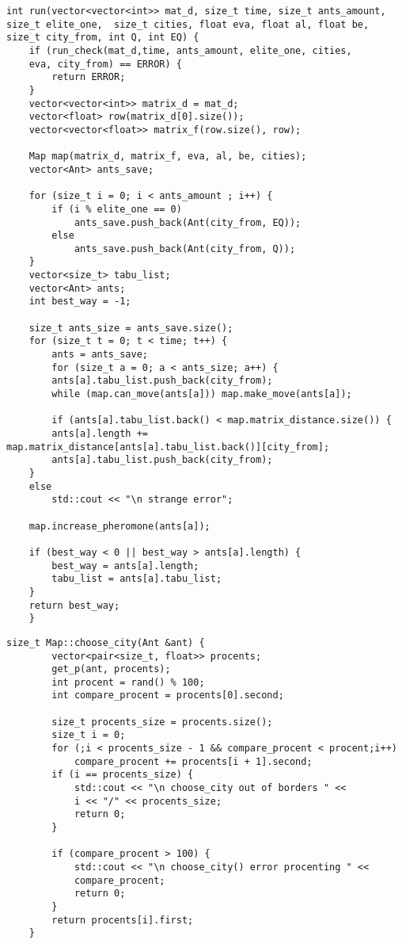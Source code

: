 \documentclass[12pt, a4paper]{report}
\begin{document}
    \begin{lstlisting}[label=code:run,caption=Функция run - получить кратчайший путь]
    int run(vector<vector<int>> mat_d, size_t time, size_t ants_amount, size_t elite_one,  size_t cities, float eva, float al, float be,  size_t city_from, int Q, int EQ) {
    if (run_check(mat_d,time, ants_amount, elite_one, cities,
    eva, city_from) == ERROR) {
    	return ERROR;
    }
    vector<vector<int>> matrix_d = mat_d;
    vector<float> row(matrix_d[0].size());
    vector<vector<float>> matrix_f(row.size(), row);
    
    Map map(matrix_d, matrix_f, eva, al, be, cities);
    vector<Ant> ants_save;
    
    for (size_t i = 0; i < ants_amount ; i++) {
	    if (i % elite_one == 0)
	    	ants_save.push_back(Ant(city_from, EQ));
	    else
	    	ants_save.push_back(Ant(city_from, Q));
    }
    vector<size_t> tabu_list;
    vector<Ant> ants;
    int best_way = -1;
    
    size_t ants_size = ants_save.size();
    for (size_t t = 0; t < time; t++) {
	    ants = ants_save;
	    for (size_t a = 0; a < ants_size; a++) {
	    ants[a].tabu_list.push_back(city_from);
	    while (map.can_move(ants[a])) map.make_move(ants[a]);
	    
	    if (ants[a].tabu_list.back() < map.matrix_distance.size()) {
	    ants[a].length += map.matrix_distance[ants[a].tabu_list.back()][city_from];
	    ants[a].tabu_list.push_back(city_from);
    }
    else
    	std::cout << "\n strange error";
    
    map.increase_pheromone(ants[a]);
    
    if (best_way < 0 || best_way > ants[a].length) {
	    best_way = ants[a].length;
	    tabu_list = ants[a].tabu_list;
	}
	return best_way;
    }
    \end{lstlisting}
    
    \begin{lstlisting}[label=code:choose_city,caption=Функция choose\_city - Выбрать следующий город для муравья]
    size_t Map::choose_city(Ant &ant) {
	    vector<pair<size_t, float>> procents;
	    get_p(ant, procents);
	    int procent = rand() % 100;
	    int compare_procent = procents[0].second;
	    
	    size_t procents_size = procents.size();
	    size_t i = 0;
	    for (;i < procents_size - 1 && compare_procent < procent;i++)
	    	compare_procent += procents[i + 1].second;
	    if (i == procents_size) {
		    std::cout << "\n choose_city out of borders " <<
		    i << "/" << procents_size;
		    return 0;
	    }
	    
	    if (compare_procent > 100) {
		    std::cout << "\n choose_city() error procenting " <<
		    compare_procent;
		    return 0;
	    }
	    return procents[i].first;
    }
    \end{lstlisting}
    
\end{document}
